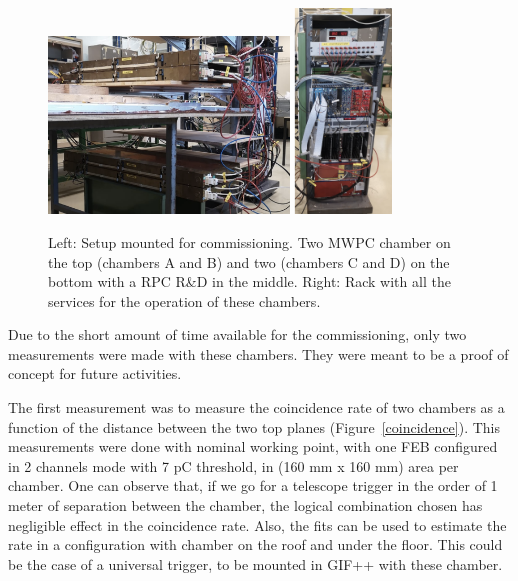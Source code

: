 \begin{figure}[!htbp]
\begin{center}
\includegraphics[width=0.57\textwidth,keepaspectratio]{figures_and_tables/rpc/mwpc/setup.png}\hspace*{1.cm}
\includegraphics[width=0.23\textwidth,keepaspectratio]{figures_and_tables/rpc/mwpc/rack.png}\hspace*{1.cm}
\end{center}
\caption{Left: Setup mounted for commissioning. Two MWPC chamber on the top (chambers A and B) and two (chambers C and D) on the bottom with a RPC R\&D in the middle. Right: Rack with all the services for the operation of these chambers.}
\label{setup}
\end{figure}

Due to the short amount of time available for the commissioning, only two measurements were made with these chambers. They were meant to be a proof of concept for future activities.

The first measurement was to measure the coincidence rate of two chambers as a function of the distance between the two top planes (Figure~\ref{coincidence}). This measurements were done with nominal working point, with one FEB configured in  2 channels mode with 7 pC threshold, in (160 mm x 160 mm) area per chamber. One can observe that, if we go for a telescope trigger in the order of 1 meter of separation between the chamber, the logical combination chosen has negligible effect in the coincidence rate. Also, the fits can be used to estimate the rate in a configuration with chamber on the roof and under the floor. This could be the case of a universal trigger, to be mounted in GIF++ with these chamber.


